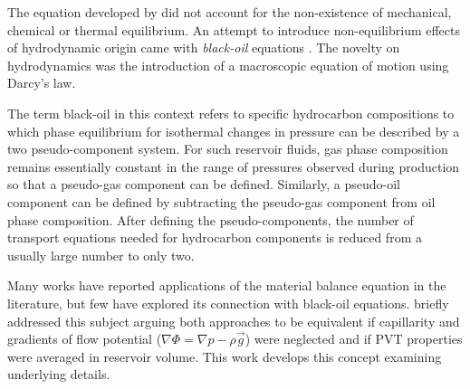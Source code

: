 \documentclass[authoryear,preprint,review,11pt]{elsarticle}
\begin{document}
The equation developed by \cite{schilthuis1936active} did not account for the non-existence of mechanical, chemical or thermal equilibrium. An attempt to introduce non-equilibrium effects of hydrodynamic origin came with \textit{black-oil} equations \citep{aziz1979petroleum,blackoil}. The novelty on hydrodynamics was the introduction of a macroscopic equation of motion using Darcy's law. 


The term black-oil in this context refers to specific hydrocarbon compositions to which phase equilibrium for isothermal changes in pressure can be described by a two pseudo-component system. For such reservoir fluids, gas phase composition remains essentially constant in the range of pressures observed during production so that a pseudo-gas component can be defined. Similarly, a pseudo-oil component can be defined by subtracting the pseudo-gas component from oil phase composition. After defining the pseudo-components, the number of transport equations needed for hydrocarbon components is reduced from a usually large number to only two.




Many works have reported applications of the material balance equation in the literature, but few have explored its connection with black-oil equations. \cite{ertekin2001basic} briefly addressed this subject arguing both approaches to be equivalent if capillarity and gradients of flow potential ($\nabla \Phi = \nabla p - \rho \vec{g}$) were neglected and if PVT properties were averaged in reservoir volume. This work develops this concept examining underlying details.
\end{document}
